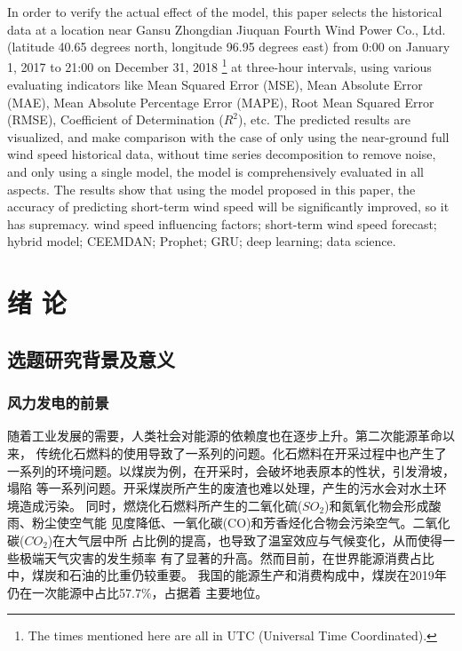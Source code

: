 \documentclass[AutoFakeBold]{LZUThesis}
\begin{document}
{{In order to verify the actual effect of the model, this paper selects the
historical data at a location near Gansu Zhongdian Jiuquan Fourth Wind
Power Co., Ltd. (latitude 40.65 degrees north, longitude 96.95 degrees
east) from 0:00 on January 1, 2017 to 21:00 on December 31, 2018 
\footnote{The times mentioned here are all in UTC (Universal Time Coordinated). } 
at three-hour intervals, using various evaluating indicators like
Mean Squared Error (MSE), Mean Absolute Error (MAE), Mean Absolute
Percentage Error (MAPE), Root Mean Squared Error (RMSE), Coefficient of
Determination ($R^2$), etc. The predicted results are visualized, and 
make comparison with the case of only using the near-ground full wind
speed historical data, without time series decomposition to remove
noise, and only using a single model, the model is comprehensively
evaluated in all aspects. The results show that using the model
proposed in this paper, the accuracy of predicting short-term
wind speed will be significantly improved, so it has supremacy.
}}
{wind speed influencing factors; short-term wind speed forecast; 
hybrid model; CEEMDAN; Prophet; GRU; deep learning; data science.
}

\tableofcontents


\mainmatter

\chapter{绪 \qquad 论}


\section{选题研究背景及意义}
\subsection{风力发电的前景}
随着工业发展的需要，人类社会对能源的依赖度也在逐步上升。第二次能源革命以来，
传统化石燃料的使用导致了一系列的问题。化石燃料在开采过程中也产生了
一系列的环境问题。以煤炭为例，在开采时，会破坏地表原本的性状，引发滑坡，塌陷
等一系列问题。开采煤炭所产生的废渣也难以处理，产生的污水会对水土环境造成污染。
同时，燃烧化石燃料所产生的二氧化硫($SO_2$)和氮氧化物会形成酸雨、粉尘使空气能
见度降低、一氧化碳(CO)和芳香烃化合物会污染空气。二氧化碳($CO_2$)在大气层中所
占比例的提高，也导致了温室效应与气候变化，从而使得一些极端天气灾害的发生频率
有了显著的升高。然而目前，在世界能源消费占比中，煤炭和石油的比重仍较重要。
我国的能源生产和消费构成中，煤炭在2019年仍在一次能源中占比57.7\%，占据着
主要地位。\cite{能源数据2021王庆一}
\end{document}
